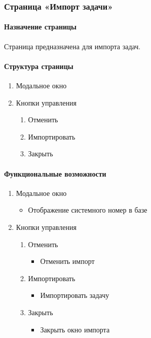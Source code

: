 \subsubsection{Страница «Импорт задачи»}
\paragraph{Назначение страницы}
Страница предназначена для импорта задач.

\paragraph{Структура страницы}
\begin{enumerate}
	\item Модальное окно
	\item Кнопки управления
	\begin{enumerate}
		\item Отменить
		\item Импортировать
		\item Закрыть
	\end{enumerate}
\end{enumerate}

\paragraph{Функциональные возможности}
\begin{enumerate}
	\item Модальное окно
	\begin{itemize}
		\item Отображение системного номер в базе
	\end{itemize}
	\item Кнопки управления
	\begin{enumerate}
		\item Отменить
		\begin{itemize}
			\item Отменить импорт
		\end{itemize}

		\item Импортировать
		\begin{itemize}
			\item Импортировать задачу
		\end{itemize}

		\item Закрыть
		\begin{itemize}
			\item Закрыть окно импорта
		\end{itemize}
	\end{enumerate}
\end{enumerate}


